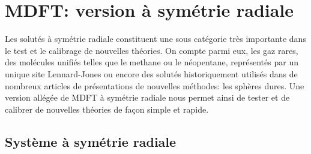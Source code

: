 \chapter{MDFT: version à symétrie radiale}


Les solutés à symétrie radiale constituent une sous catégorie très importante dans le test et le calibrage de nouvelles théories. On compte parmi eux, les gaz rares, des molécules unifiés telles que le methane ou le néopentane, représentés par un unique site Lennard-Jones ou encore des solutés historiquement utilisés dans de nombreux articles de présentations de nouvelles méthodes: les sphères dures. Une version allégée de MDFT à symétrie radiale nous permet ainsi de tester et de calibrer de nouvelles théories de façon simple et rapide.

\section{Système à symétrie radiale}

